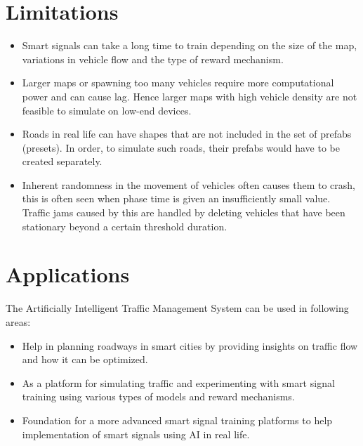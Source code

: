 \documentclass[openany,12pt]{report}
\begin{document}
		\section{Limitations}
		\begin{itemize}
			\item{Smart signals can take a long time to train depending on the size of the map, variations in vehicle flow and the type of reward mechanism.}
			\item{Larger maps or spawning too many vehicles require more computational power and can cause lag. Hence larger maps with high vehicle density are not feasible to simulate on low-end devices.}
			\item{Roads in real life can have shapes that are not included in the set of prefabs (presets). In order, to simulate such roads, their prefabs would have to be created separately.}
			\item{Inherent randomness in the movement of vehicles often causes them to crash, this is often seen when phase time is given an insufficiently small value. Traffic jams caused by this are handled by deleting vehicles that have been stationary beyond a certain threshold duration.}
		\end{itemize}				
		
		
		\section{Applications}
		\hspace*{0.5in}The Artificially Intelligent Traffic Management System can be used in following areas:
		\begin{itemize}
			\item{Help in planning roadways in smart cities by providing insights on traffic flow and how it can be optimized.}
			\item{As a platform for simulating traffic and experimenting with smart signal training using various types of models and reward mechanisms.}
			\item{Foundation for a more advanced smart signal training platforms to help implementation of smart signals using AI in real life.}
		\end{itemize}
		
\end{document}

